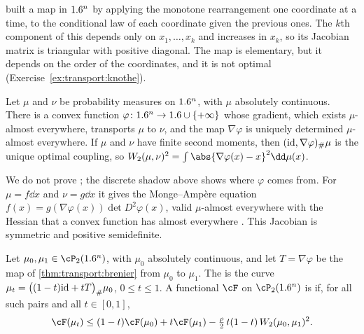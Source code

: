 \begin{refsection}
\textcite{Knothe1957} built a map in $1.6^n$ by applying the monotone rearrangement one coordinate at a time, to the conditional law of each coordinate given the previous ones. The $k$th component of this  depends only on $x_1,\dots,x_k$ and increases in $x_k$, so its Jacobian matrix is triangular with positive diagonal. The map is elementary, but it depends on the order of the coordinates, and it is not optimal (Exercise~\ref{ex:transport:knothe}).

\begin{theorem}\label{thm:transport:brenier}
Let $\mu$ and $\nu$ be probability measures on $1.6^n$, with $\mu$ absolutely continuous. There is a convex function $\varphi\colon1.6^n\to1.6\cup\{+\infty\}$ whose gradient, which exists $\mu$-almost everywhere, transports $\mu$ to $\nu$, and the map $\nabla\varphi$ is uniquely determined $\mu$-almost everywhere. If $\mu$ and $\nu$ have finite second moments, then $(\mathrm{id},\nabla\varphi)_{\#}\mu$ is the unique optimal coupling, so $\transportW(\mu,\nu)^2=\int\abs{\nabla\varphi(x)-x}^2\dd\mu(x)$.
\end{theorem}

We do not prove  \parencite[see][]{Villani2003}; the discrete shadow above shows where $\varphi$ comes from. For $\mu=f\dd x$ and $\nu=g\dd x$ it gives the Monge--Amp\`ere equation $f(x)=g(\nabla\varphi(x))\det D^2\varphi(x)$, valid $\mu$-almost everywhere with the Hessian that a convex function has almost everywhere \parencite{McCann1997}. This Jacobian is symmetric and positive semidefinite.

\begin{definition}\label{def:transport:displacement}
Let $\mu_0,\mu_1\in\cP_2(\R^n)$, with $\mu_0$ absolutely continuous, and let $T=\nabla\varphi$ be the map of \cref{thm:transport:brenier} from $\mu_0$ to $\mu_1$. The  is the curve $\mu_t=\bigl((1-t)\mathrm{id}+tT\bigr)_{\#}\mu_0$, $0\le t\le1$. A functional $\cF$ on $\cP_2(\R^n)$ is  if, for all such pairs and all $t\in[0,1]$,
\[
\cF(\mu_t)\le(1-t)\cF(\mu_0)+t\cF(\mu_1)-\tfrac{\rho}{2}\,t(1-t)\,\transportW(\mu_0,\mu_1)^2.
\]
\end{definition}


\end{refsection}
